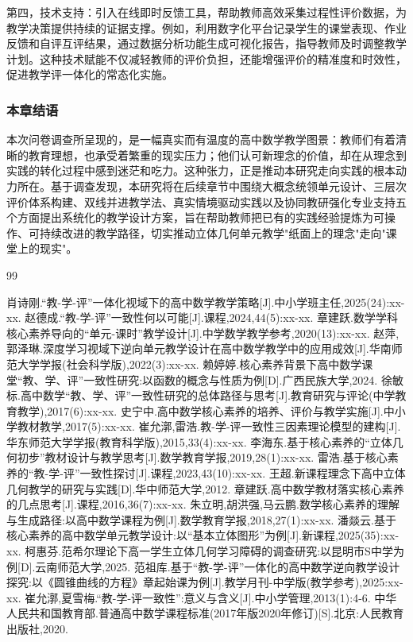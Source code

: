 \documentclass[UTF8,a4paper,12pt,twoside]{ctexart}
\begin{document}
第四，技术支持：引入在线即时反馈工具，帮助教师高效采集过程性评价数据，为教学决策提供持续的证据支撑。例如，利用数字化平台记录学生的课堂表现、作业反馈和自评互评结果，通过数据分析功能生成可视化报告，指导教师及时调整教学计划。这种技术赋能不仅减轻教师的评价负担，还能增强评价的精准度和时效性，促进教学评一体化的常态化实施。

\subsubsection{本章结语}

本次问卷调查所呈现的，是一幅真实而有温度的高中数学教学图景：教师们有着清晰的教育理想，也承受着繁重的现实压力；他们认可新理念的价值，却在从理念到实践的转化过程中感到迷茫和吃力。这种张力，正是推动本研究走向实践的根本动力所在。基于调查发现，本研究将在后续章节中围绕大概念统领单元设计、三层次评价体系构建、双线并进教学法、真实情境驱动实践以及协同教研强化专业支持五个方面提出系统化的教学设计方案，旨在帮助教师把已有的实践经验提炼为可操作、可持续改进的教学路径，切实推动立体几何单元教学"纸面上的理念"走向"课堂上的现实"。
\newpage

\begin{thebibliography}{99}
\setlength{\itemsep}{-0.75ex}
肖诗刚.``教-学-评''一体化视域下的高中数学教学策略[J].中小学班主任,2025(24):xx-xx.
赵德成.``教-学-评''一致性何以可能[J].课程,2024,44(5):xx-xx.
章建跃.数学学科核心素养导向的``单元-课时''教学设计[J].中学数学教学参考,2020(13):xx-xx.
赵萍,郭泽琳.深度学习视域下逆向单元教学设计在高中数学教学中的应用成效[J].华南师范大学学报(社会科学版),2022(3):xx-xx.
赖婷婷.核心素养背景下高中数学课堂``教、学、评''一致性研究:以函数的概念与性质为例[D].广西民族大学,2024.
徐敏标.高中数学``教、学、评''一致性研究的总体路径与思考[J].教育研究与评论(中学教育教学),2017(6):xx-xx.
史宁中.高中数学核心素养的培养、评价与教学实施[J].中小学教材教学,2017(5):xx-xx.
崔允漷,雷浩.教-学-评一致性三因素理论模型的建构[J].华东师范大学学报(教育科学版),2015,33(4):xx-xx.
李海东.基于核心素养的``立体几何初步''教材设计与教学思考[J].数学教育学报,2019,28(1):xx-xx.
雷浩.基于核心素养的``教-学-评''一致性探讨[J].课程,2023,43(10):xx-xx.
王超.新课程理念下高中立体几何教学的研究与实践[D].华中师范大学,2012.
章建跃.高中数学教材落实核心素养的几点思考[J].课程,2016,36(7):xx-xx.
朱立明,胡洪强,马云鹏.数学核心素养的理解与生成路径:以高中数学课程为例[J].数学教育学报,2018,27(1):xx-xx.
潘燚云.基于核心素养的高中数学单元教学设计:以``基本立体图形''为例[J].新课程,2025(35):xx-xx.
柯惠芬.范希尔理论下高一学生立体几何学习障碍的调查研究:以昆明市S中学为例[D].云南师范大学,2025.
范祖库.基于``教-学-评''一体化的高中数学逆向教学设计探究:以《圆锥曲线的方程》章起始课为例[J].教学月刊-中学版(教学参考),2025:xx-xx.
崔允漷,夏雪梅.``教-学-评一致性'':意义与含义[J].中小学管理,2013(1):4-6.
中华人民共和国教育部.普通高中数学课程标准(2017年版2020年修订)[S].北京:人民教育出版社,2020.
\end{thebibliography}
\newpage
\end{document}
